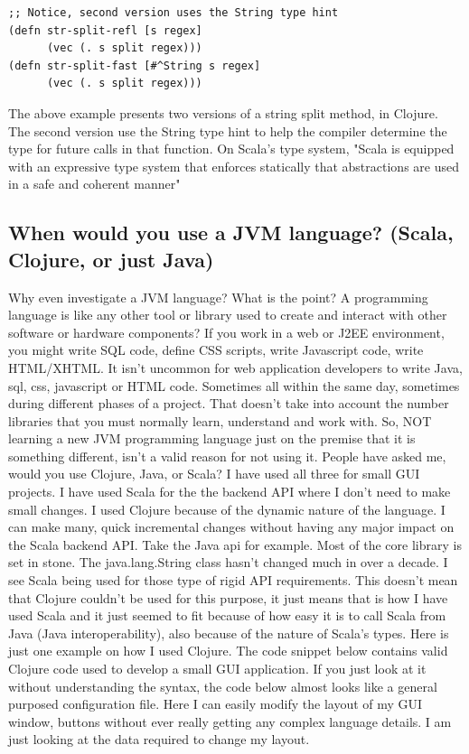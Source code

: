 \begin{verbatim}
;; Notice, second version uses the String type hint
(defn str-split-refl [s regex]
      (vec (. s split regex)))
(defn str-split-fast [#^String s regex]
      (vec (. s split regex)))
\end{verbatim}

The above example presents two versions of a string split method, in Clojure. The second version use the String type hint to help the compiler determine the type for future calls in that function. On Scala's type system, "Scala is equipped with an expressive type system that enforces statically that abstractions are used in a safe and coherent manner"

\subsection{When would you use a JVM language? (Scala, Clojure, or just Java)}

Why even investigate a JVM language? What is the point? A programming language is like any other tool or library used to create and interact with other software or hardware components? If you work in a web or J2EE environment, you might write SQL code, define CSS scripts, write Javascript code, write HTML/XHTML. It isn't uncommon for web application developers to write Java, sql, css, javascript or HTML code. Sometimes all within the same day, sometimes during different phases of a project. That doesn't take into account the number libraries that you must normally learn, understand and work with. So, NOT learning a new JVM programming language just on the premise that it is something different, isn't a valid reason for not using it. People have asked me, would you use Clojure, Java, or Scala? I have used all three for small GUI projects. I have used Scala for the the backend API where I don't need to make small changes. I used Clojure because of the dynamic nature of the language. I can make many, quick incremental changes without having any major impact on the Scala backend API. Take the Java api for example. Most of the core library is set in stone. The java.lang.String class hasn't changed much in over a decade. I see Scala being used for those type of rigid API requirements. This doesn't mean that Clojure couldn't be used for this purpose, it just means that is how I have used Scala and it just seemed to fit because of how easy it is to call Scala from Java (Java interoperability), also because of the nature of Scala's types. Here is just one example on how I used Clojure. The code snippet below contains valid Clojure code used to develop a small GUI application. If you just look at it without understanding the syntax, the code below almost looks like a general purposed configuration file. Here I can easily modify the layout of my GUI window, buttons without ever really getting any complex language details. I am just looking at the data required to change my layout.

